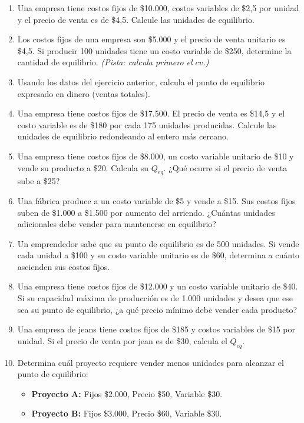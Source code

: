 \documentclass[12pt,a4paper]{article}
\newcommand{\answerspace}{\vspace{4.5cm}}
\newcommand{\lastanswerspace}{\vspace{2cm}}
\begin{document}
\begin{enumerate}[label=\textbf{\arabic*.}, leftmargin=*, itemsep=0pt]

\item Una empresa tiene costos fijos de \$10.000, costos variables de \$2,5 por unidad y el precio de venta es de \$4,5. Calcule las unidades de equilibrio.
\answerspace

\item Los costos fijos de una empresa son \$5.000 y el precio de venta unitario es \$4,5. Si producir 100 unidades tiene un costo variable de \$250, determine la cantidad de equilibrio. \textit{(Pista: calcula primero el $cv$.)}
\answerspace

\item Usando los datos del ejercicio anterior, calcula el punto de equilibrio expresado en dinero (ventas totales).
\answerspace

\item Una empresa tiene costos fijos de \$17.500. El precio de venta es \$14,5 y el costo variable es de \$180 por cada 175 unidades producidas. Calcule las unidades de equilibrio redondeando al entero más cercano.
\answerspace

\item Una empresa tiene costos fijos de \$8.000, un costo variable unitario de \$10 y vende su producto a \$20. Calcula su $Q_{eq}$. ¿Qué ocurre si el precio de venta sube a \$25?
\answerspace

\item Una fábrica produce a un costo variable de \$5 y vende a \$15. Sus costos fijos suben de \$1.000 a \$1.500 por aumento del arriendo. ¿Cuántas unidades adicionales debe vender para mantenerse en equilibrio?
\answerspace

\item Un emprendedor sabe que su punto de equilibrio es de 500 unidades. Si vende cada unidad a \$100 y su costo variable unitario es de \$60, determina a cuánto ascienden sus costos fijos.
\answerspace

\item Una empresa tiene costos fijos de \$12.000 y un costo variable unitario de \$40. Si su capacidad máxima de producción es de 1.000 unidades y desea que ese sea su punto de equilibrio, ¿a qué precio mínimo debe vender cada producto?
\answerspace

\item Una empresa de jeans tiene costos fijos de \$185 y costos variables de \$15 por unidad. Si el precio de venta por jean es de \$30, calcula el $Q_{eq}$.
\answerspace

\item Determina cuál proyecto requiere vender menos unidades para alcanzar el punto de equilibrio:
  \begin{itemize}
    \item \textbf{Proyecto A:} Fijos \$2.000, Precio \$50, Variable \$30.
    \item \textbf{Proyecto B:} Fijos \$3.000, Precio \$60, Variable \$30.
  \end{itemize}
\lastanswerspace

\end{enumerate}
\end{document}
